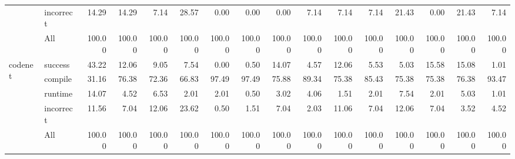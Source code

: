\begin{tabular}{llrrrrrrrrrrrrrr}
 & incorrect & 14.29 & 14.29 & 7.14 & 28.57 & 0.00 & 0.00 & 0.00 & 7.14 & 7.14 & 7.14 & 21.43 & 0.00 & 21.43 & 7.14 \\
 & All & 100.00 & 100.00 & 100.00 & 100.00 & 100.00 & 100.00 & 100.00 & 100.00 & 100.00 & 100.00 & 100.00 & 100.00 & 100.00 & 100.00 \\
\cline{1-16}
\multirow[t]{5}{*}{codenet} & success & 43.22 & 12.06 & 9.05 & 7.54 & 0.00 & 0.50 & 14.07 & 4.57 & 12.06 & 5.53 & 5.03 & 15.58 & 15.08 & 1.01 \\
 & compile & 31.16 & 76.38 & 72.36 & 66.83 & 97.49 & 97.49 & 75.88 & 89.34 & 75.38 & 85.43 & 75.38 & 75.38 & 76.38 & 93.47 \\
 & runtime & 14.07 & 4.52 & 6.53 & 2.01 & 2.01 & 0.50 & 3.02 & 4.06 & 1.51 & 2.01 & 7.54 & 2.01 & 5.03 & 1.01 \\
 & incorrect & 11.56 & 7.04 & 12.06 & 23.62 & 0.50 & 1.51 & 7.04 & 2.03 & 11.06 & 7.04 & 12.06 & 7.04 & 3.52 & 4.52 \\
 & All & 100.00 & 100.00 & 100.00 & 100.00 & 100.00 & 100.00 & 100.00 & 100.00 & 100.00 & 100.00 & 100.00 & 100.00 & 100.00 & 100.00 \\
\cline{1-16}
\bottomrule
\end{tabular}
